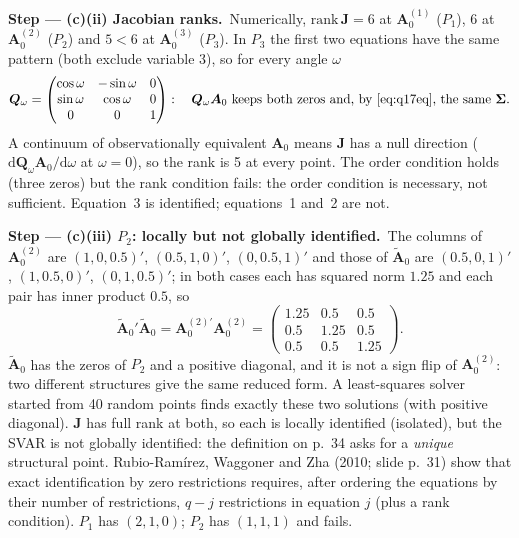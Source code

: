 \documentclass[11pt,a4paper]{article}
\newcommand{\passo}[2]{\par\smallskip\noindent\textbf{Step --- #1.}~#2}
\begin{document}
\begin{sol}
\passo{(c)(ii) Jacobian ranks}{Numerically, $\mathrm{rank}\,\bm J=6$ at $\bm A_0^{(1)}$ ($P_1$), $6$ at $\bm A_0^{(2)}$ ($P_2$) and
$5<6$ at $\bm A_0^{(3)}$ ($P_3$). In $P_3$ the first two equations have the same pattern (both exclude variable 3), so for every angle
$\omega$
\begin{equation}
\bm Q_\omega=\begin{pmatrix}\cos\omega&-\sin\omega&0\\\sin\omega&\cos\omega&0\\0&0&1\end{pmatrix}:\quad
\bm Q_\omega\bm A_0\text{ keeps both zeros and, by \eqref{eq:q17eq}, the same }\bm{\Sigma}.\nonumber
\end{equation}
A continuum of observationally equivalent $\bm A_0$ means $\bm J$ has a null direction ($\mathrm{d}\bm Q_\omega\bm A_0/\mathrm{d}\omega$ at
$\omega=0$), so the rank is 5 at every point. The order condition holds (three zeros) but the rank condition fails: the order
condition is necessary, not sufficient. Equation~3 is identified; equations~1 and~2 are not.}

\passo{(c)(iii) $P_2$: locally but not globally identified}{The columns of $\bm A_0^{(2)}$ are $(1,0,0.5)'$, $(0.5,1,0)'$,
$(0,0.5,1)'$ and those of $\tilde{\bm A}_0$ are $(0.5,0,1)'$, $(1,0.5,0)'$, $(0,1,0.5)'$; in both cases each has squared norm
$1.25$ and each pair has inner product $0.5$, so
\begin{equation}
\tilde{\bm A}_0'\tilde{\bm A}_0=\bm A_0^{(2)\prime}\bm A_0^{(2)}=\begin{pmatrix}1.25&0.5&0.5\\0.5&1.25&0.5\\0.5&0.5&1.25\end{pmatrix}.\nonumber
\end{equation}
$\tilde{\bm A}_0$ has the zeros of $P_2$ and a positive diagonal, and it is not a sign flip of $\bm A_0^{(2)}$: two different structures
give the same reduced form. A least-squares solver started from 40 random points finds exactly these two solutions (with
positive diagonal). $\bm J$ has full rank at both, so each is locally identified (isolated), but the SVAR is not globally identified:
the definition on p.~34 asks for a \emph{unique} structural point. Rubio-Ram\'irez, Waggoner and Zha (2010; slide p.~31) show that
exact identification by zero restrictions requires, after ordering the equations by their number of restrictions, $q-j$
restrictions in equation $j$ (plus a rank condition). $P_1$ has $(2,1,0)$; $P_2$ has $(1,1,1)$ and fails.}


\end{sol}
\end{document}
